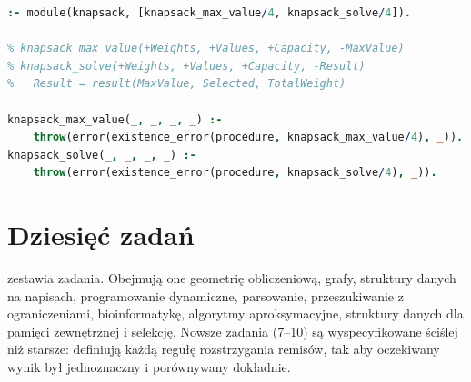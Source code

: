 \begin{lstlisting}[language=Prolog,caption={Ten sam kontrakt w Prologu: moduł-szkielet \file{knapsack.pl} z trybami argumentów udokumentowanymi w komentarzach.},label={lst:contract-pl}]
:- module(knapsack, [knapsack_max_value/4, knapsack_solve/4]).

% knapsack_max_value(+Weights, +Values, +Capacity, -MaxValue)
% knapsack_solve(+Weights, +Values, +Capacity, -Result)
%   Result = result(MaxValue, Selected, TotalWeight)

knapsack_max_value(_, _, _, _) :-
    throw(error(existence_error(procedure, knapsack_max_value/4), _)).
knapsack_solve(_, _, _, _) :-
    throw(error(existence_error(procedure, knapsack_solve/4), _)).
\end{lstlisting}

\section{Dziesięć zadań}
\label{sec:tasks}

 zestawia zadania. Obejmują one geometrię obliczeniową, grafy, struktury danych na
napisach, programowanie dynamiczne, parsowanie, przeszukiwanie z ograniczeniami, bioinformatykę,
algorytmy aproksymacyjne, struktury danych dla pamięci zewnętrznej i selekcję. Nowsze zadania (7--10)
są wyspecyfikowane ściślej niż starsze: definiują każdą regułę rozstrzygania remisów, tak aby
oczekiwany wynik był jednoznaczny i porównywany dokładnie.

